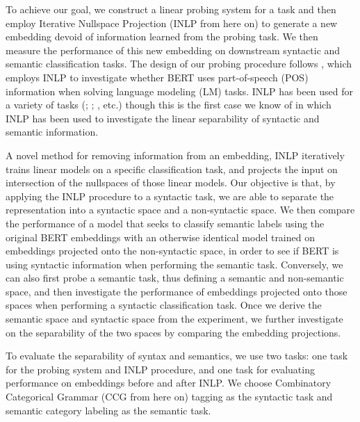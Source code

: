 \documentclass[11pt,a4paper]{article}
\begin{document}
To achieve our goal, we construct a linear probing system for a task and then employ Iterative Nullspace Projection (INLP from here on) \citep{inlp} to generate a new embedding devoid of information learned from the probing task. We then measure the performance of this new embedding on downstream syntactic and semantic classification tasks. The design of our probing procedure follows \citealp{amnesia}, which employs INLP to investigate whether BERT uses part-of-speech (POS) information when solving language modeling (LM) tasks. INLP has been used for a variety of tasks (\citealp{inlp}; \citealp{amnesia}; \citealp{mbertGreek}, etc.) though this is the first case we know of in which INLP has been used to investigate the linear separability of syntactic and semantic information. 

A novel method for removing information from an embedding, INLP iteratively trains linear models on a specific classification task, and projects the input on intersection of the nullspaces of those linear models. Our objective is that, by applying the INLP procedure to a syntactic task, we are able to separate the representation into a syntactic space and a non-syntactic space. We then compare the performance of a model that seeks to classify semantic labels using the original BERT embeddings with an otherwise identical model trained on embeddings projected onto the non-syntactic space, in order to see if BERT is using syntactic information when performing the semantic task. Conversely, we can also first probe a semantic task, thus defining a semantic and non-semantic space, and then investigate the performance of embeddings projected onto those spaces when performing a syntactic classification task. Once we derive the semantic space and syntactic space from the experiment, we further investigate on the separability of the two spaces by comparing the embedding projections. %

To evaluate the separability of syntax and semantics, we use two tasks: one task for the probing system and INLP procedure, and one task for evaluating performance on embeddings before and after INLP. We choose Combinatory Categorical Grammar (CCG from here on) tagging \citep{ccg-bank} as the syntactic task and semantic category labeling \citep{propbank} as the semantic task. 
\end{document}
